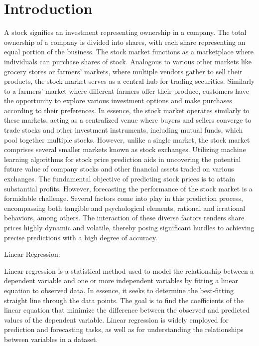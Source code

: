 \documentclass[conference,onecolumn,11pt]{IEEEtran}
\begin{document}
\section{Introduction}
A stock signifies an investment representing ownership in a company. The total ownership of a company is divided into shares, with each share representing an equal portion of the business. The stock market functions as a marketplace where individuals can purchase shares of stock. Analogous to various other markets like grocery stores or farmers’ markets, where multiple vendors gather to sell their products, the stock market serves as a central hub for trading securities. Similarly to a farmers’ market where different farmers offer their produce, customers have the opportunity to explore various investment options and make purchases according to their preferences. In essence, the stock market operates similarly to these markets, acting as a centralized venue where buyers and sellers converge to trade stocks and other investment instruments, including mutual funds, which pool together multiple stocks. However, unlike a single market, the stock market comprises several smaller markets known as stock exchanges.
Utilizing machine learning algorithms for stock price prediction aids in uncovering the potential future value of company stocks and other financial assets traded on various exchanges. The fundamental objective of predicting stock prices is to attain substantial profits. However, forecasting the performance of the stock market is a formidable challenge. Several factors come into play in this prediction process, encompassing both tangible and psychological elements, rational and irrational behaviors, among others.
The interaction of these diverse factors renders share prices highly dynamic and volatile, thereby posing significant hurdles to achieving precise predictions with a high degree of accuracy.

Linear Regression:

Linear regression is a statistical method used to model the relationship between a dependent variable and one or more independent variables by fitting a linear equation to observed data. In essence, it seeks to determine the best-fitting straight line through the data points. The goal is to find the coefficients of the linear equation that minimize the difference between the observed and predicted values of the dependent variable. Linear regression is widely employed for prediction and forecasting tasks, as well as for understanding the relationships between variables in a dataset.
\end{document}
